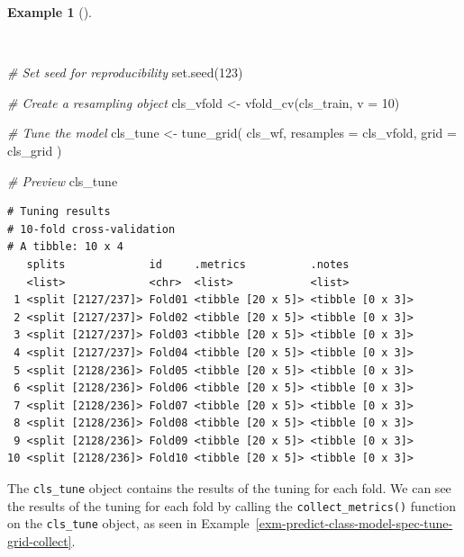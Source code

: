 \documentclass[
  letterpaper,
]{latex/krantz}
\newenvironment{Shaded}{\begin{snugshade}}{\end{snugshade}}
\newcommand{\AttributeTok}[1]{\textcolor[rgb]{0.00,0.00,0.00}{#1}}
\newcommand{\CommentTok}[1]{\textcolor[rgb]{0.00,0.00,0.00}{\textit{#1}}}
\newcommand{\DecValTok}[1]{\textcolor[rgb]{0.00,0.00,0.00}{#1}}
\newcommand{\FunctionTok}[1]{\textcolor[rgb]{0.00,0.00,0.00}{#1}}
\newcommand{\NormalTok}[1]{\textcolor[rgb]{0.00,0.00,0.00}{#1}}
\newcommand{\OtherTok}[1]{\textcolor[rgb]{0.00,0.00,0.00}{#1}}
\theoremstyle{definition}
\newtheorem{example}{Example}[chapter]
\theoremstyle{remark}
\begin{document}
\begin{example}[]\protect\hypertarget{exm-predict-class-model-spec-tune-grid-cv}{}\label{exm-predict-class-model-spec-tune-grid-cv}

~

\begin{Shaded}
\begin{Highlighting}[]
\CommentTok{\# Set seed for reproducibility}
\FunctionTok{set.seed}\NormalTok{(}\DecValTok{123}\NormalTok{)}

\CommentTok{\# Create a resampling object}
\NormalTok{cls\_vfold }\OtherTok{\textless{}{-}} \FunctionTok{vfold\_cv}\NormalTok{(cls\_train, }\AttributeTok{v =} \DecValTok{10}\NormalTok{)}

\CommentTok{\# Tune the model}
\NormalTok{cls\_tune }\OtherTok{\textless{}{-}}
  \FunctionTok{tune\_grid}\NormalTok{(}
\NormalTok{    cls\_wf,}
    \AttributeTok{resamples =}\NormalTok{ cls\_vfold,}
    \AttributeTok{grid =}\NormalTok{ cls\_grid}
\NormalTok{    )}

\CommentTok{\# Preview}
\NormalTok{cls\_tune}
\end{Highlighting}
\end{Shaded}

\begin{verbatim}
# Tuning results
# 10-fold cross-validation 
# A tibble: 10 x 4
   splits             id     .metrics          .notes          
   <list>             <chr>  <list>            <list>          
 1 <split [2127/237]> Fold01 <tibble [20 x 5]> <tibble [0 x 3]>
 2 <split [2127/237]> Fold02 <tibble [20 x 5]> <tibble [0 x 3]>
 3 <split [2127/237]> Fold03 <tibble [20 x 5]> <tibble [0 x 3]>
 4 <split [2127/237]> Fold04 <tibble [20 x 5]> <tibble [0 x 3]>
 5 <split [2128/236]> Fold05 <tibble [20 x 5]> <tibble [0 x 3]>
 6 <split [2128/236]> Fold06 <tibble [20 x 5]> <tibble [0 x 3]>
 7 <split [2128/236]> Fold07 <tibble [20 x 5]> <tibble [0 x 3]>
 8 <split [2128/236]> Fold08 <tibble [20 x 5]> <tibble [0 x 3]>
 9 <split [2128/236]> Fold09 <tibble [20 x 5]> <tibble [0 x 3]>
10 <split [2128/236]> Fold10 <tibble [20 x 5]> <tibble [0 x 3]>
\end{verbatim}

\end{example}

The \texttt{cls\_tune} object contains the results of the tuning for
each fold. We can see the results of the tuning for each fold by calling
the \texttt{collect\_metrics()} function on the \texttt{cls\_tune}
object, as seen in
Example~\ref{exm-predict-class-model-spec-tune-grid-collect}.
\end{document}
